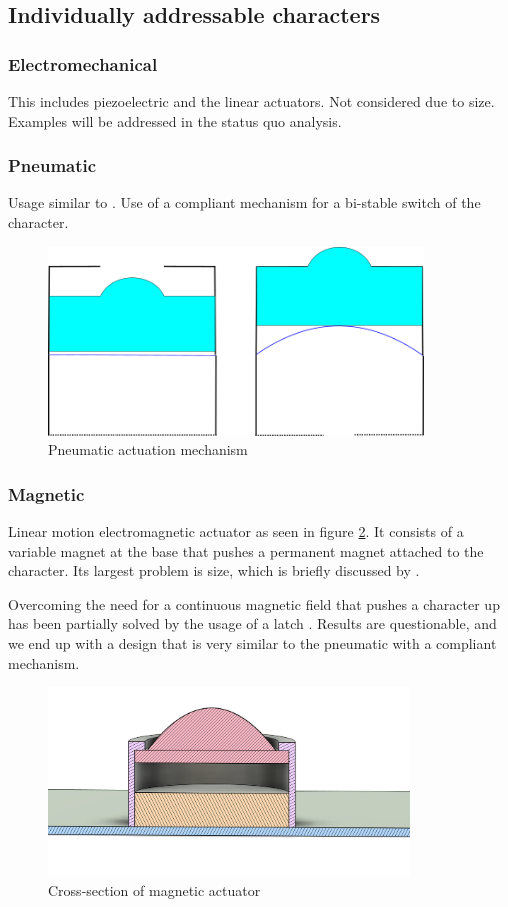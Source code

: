     \subsection{Individually addressable characters}
    \subsubsection{Electromechanical}
    This includes piezoelectric and the linear actuators. Not considered due to size. Examples will be addressed in the status quo analysis.

    \subsubsection{Pneumatic}
    Usage similar to \cite{XieZhixin2021A2rB}. Use of a compliant mechanism for a bi-stable switch of the character.  
    \begin{figure}[h]
    \centering
        \includegraphics[height=5cm]{figures/pneumatic.png}
    \caption{Pneumatic actuation mechanism}
    \label{fig:pneumatic.png}
    \end{figure}

    \subsubsection{Magnetic}

    Linear motion electromagnetic actuator as seen in figure \ref{fig:magnet-cross_section.png}.
    It consists of a variable magnet at the base that pushes a permanent magnet attached to the character. Its largest problem is size, which is briefly discussed by \cite{BettelaniGemmaCarolina2020DaVo}.


    Overcoming the need for a continuous magnetic field that pushes a character up has been partially solved by the usage of a latch \cite{KimJoonyeong2020BDfP}. Results are questionable, and we end up with a design that is very similar to the pneumatic with a compliant mechanism.


    \begin{figure}[h]
    \centering
        \includegraphics[height=5cm]{figures/magnet-cross_section.png}
    \caption{Cross-section of magnetic actuator}
    \label{fig:magnet-cross_section.png}
    \end{figure}


